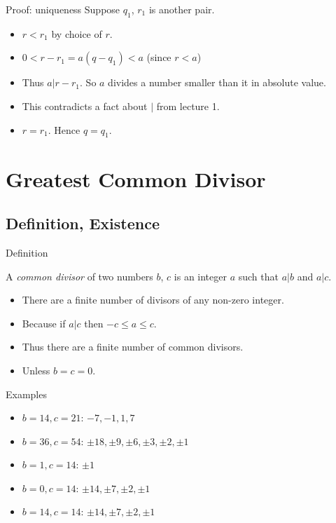 \documentclass{beamer}
\begin{document}
\begin{frame}{Proof: uniqueness}
  Suppose $q_1$, $r_1$ is another pair.
  \begin{itemize}
  \item $r < r_1$ by choice of $r$.
  \item $0 < r - r_1  = a(q - q_1) < a$ (since $r < a$)
  \item Thus $a | r - r_1$. So $a$ divides a number smaller than it in
    absolute value.
  \item This contradicts a fact about $|$ from lecture 1.
  \item $r = r_1$. Hence $q = q_1$.
  \end{itemize}
\end{frame}


\section{Greatest Common Divisor}

\subsection{Definition, Existence}

\begin{frame}{Definition}

  A {\it common divisor} of two numbers $b$, $c$ is an integer $a$
  such that $a | b$ and $a | c$.

  \begin{itemize}
  \item There are a finite number of divisors of any non-zero integer.
    \pause
  \item Because if $a | c$ then $-c \le a \le c$.
    \pause
  \item Thus there are a finite number of common divisors.
    \pause
  \item Unless $b = c = 0$.
  \end{itemize}

\end{frame}

\begin{frame}{Examples}
  \begin{itemize}
  \item $b = 14, c = 21$: $-7, -1, 1, 7$
  \item $b = 36, c = 54$: $\pm 18, \pm 9, \pm 6, \pm 3, \pm 2, \pm 1$ 
  \item $b = 1, c = 14$: $\pm 1$
  \item $b = 0, c = 14$: $\pm 14, \pm 7, \pm 2, \pm 1$
  \item $b = 14, c = 14$: $\pm 14, \pm 7, \pm 2, \pm 1$
  \end{itemize}
\end{frame}
\end{document}
